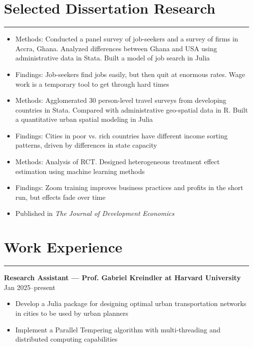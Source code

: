 \documentclass[10pt]{article}
\newenvironment{customitemize}
{ \begin{itemize}[leftmargin=\parindent, topsep = 0.2pt, itemsep = -3pt] }
{\end{itemize} }
\begin{document}
\section*{Selected Dissertation Research}
\noindent \rule{\textwidth}{1pt} 
\begin{customitemize}
\item Methods: Conducted a panel survey of job-seekers and a survey of firms in Accra, Ghana. Analyzed differences between Ghana and USA using administrative data in Stata. Built a model of job search in Julia
\item Findings: Job-seekers find jobs easily, but then quit at enormous rates. Wage work is a temporary tool to get through hard times 
\end{customitemize}
\begin{customitemize}
	\item Methods: Agglomerated 30 person-level travel surveys from developing countries in Stata. Compared with administrative geo-spatial data in R. Built a quantitative urban spatial modeling in Julia
	\item Findings: Cities in poor vs. rich countries have different income sorting patterns, driven by differences in state capacity
\end{customitemize}
\begin{customitemize}
	\item Methods: Analysis of RCT. Designed heterogeneous treatment effect estimation using machine learning methods
	\item Findings: Zoom training improves business practices and profits in the short run, but effects fade over time
	\item Published in \textit{The Journal of Development Economics}
\end{customitemize}

\section*{Work Experience} 
\noindent \rule{\textwidth}{1pt} 

\noindent \textbf{Research Assistant --- Prof. Gabriel Kreindler at Harvard University}  \hfill Jan 2025--present 
\begin{customitemize}
	\item Develop a Julia package for designing optimal urban transportation networks in cities to be used by urban planners
	\item Implement a Parallel Tempering algorithm with multi-threading and distributed computing capabilities
\end{customitemize}
\end{document}
